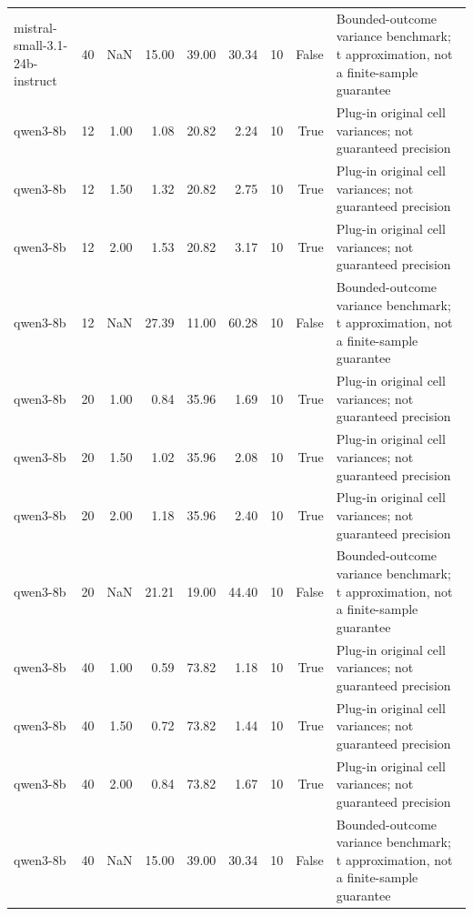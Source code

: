 \begin{tabular}{lrrrrrrrl}
mistral-small-3.1-24b-instruct & 40 & NaN & 15.00 & 39.00 & 30.34 & 10 & False & Bounded-outcome variance benchmark; t approximation, not a finite-sample guarantee \\
qwen3-8b & 12 & 1.00 & 1.08 & 20.82 & 2.24 & 10 & True & Plug-in original cell variances; not guaranteed precision \\
qwen3-8b & 12 & 1.50 & 1.32 & 20.82 & 2.75 & 10 & True & Plug-in original cell variances; not guaranteed precision \\
qwen3-8b & 12 & 2.00 & 1.53 & 20.82 & 3.17 & 10 & True & Plug-in original cell variances; not guaranteed precision \\
qwen3-8b & 12 & NaN & 27.39 & 11.00 & 60.28 & 10 & False & Bounded-outcome variance benchmark; t approximation, not a finite-sample guarantee \\
qwen3-8b & 20 & 1.00 & 0.84 & 35.96 & 1.69 & 10 & True & Plug-in original cell variances; not guaranteed precision \\
qwen3-8b & 20 & 1.50 & 1.02 & 35.96 & 2.08 & 10 & True & Plug-in original cell variances; not guaranteed precision \\
qwen3-8b & 20 & 2.00 & 1.18 & 35.96 & 2.40 & 10 & True & Plug-in original cell variances; not guaranteed precision \\
qwen3-8b & 20 & NaN & 21.21 & 19.00 & 44.40 & 10 & False & Bounded-outcome variance benchmark; t approximation, not a finite-sample guarantee \\
qwen3-8b & 40 & 1.00 & 0.59 & 73.82 & 1.18 & 10 & True & Plug-in original cell variances; not guaranteed precision \\
qwen3-8b & 40 & 1.50 & 0.72 & 73.82 & 1.44 & 10 & True & Plug-in original cell variances; not guaranteed precision \\
qwen3-8b & 40 & 2.00 & 0.84 & 73.82 & 1.67 & 10 & True & Plug-in original cell variances; not guaranteed precision \\
qwen3-8b & 40 & NaN & 15.00 & 39.00 & 30.34 & 10 & False & Bounded-outcome variance benchmark; t approximation, not a finite-sample guarantee \\
\bottomrule
\end{tabular}
